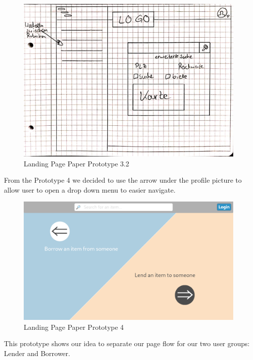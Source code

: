 			
			\begin{figure}[H]
				\centering
				\includegraphics[width=0.9\linewidth]{src/abb/6_Sketching and Paper Prototyping/Homepage4.png}
				\caption{Landing Page Paper Prototype 3.2}
				\label{fig:Homepage4}
			\end{figure}
			
			\noindent
			From the Prototype 4 we decided to use the arrow under the profile picture to allow user to open a drop down menu to easier navigate.
			
			\begin{figure}[H]
				\centering
				\includegraphics[width=\linewidth]{src/abb/6_Sketching and Paper Prototyping/Homepage5.png}
				\caption{Landing Page Paper Prototype 4}
				\label{fig:Homepage4}
			\end{figure}
			
			\noindent
			This prototype shows our idea to separate our page flow for our two user groups: Lender and Borrower.
			
